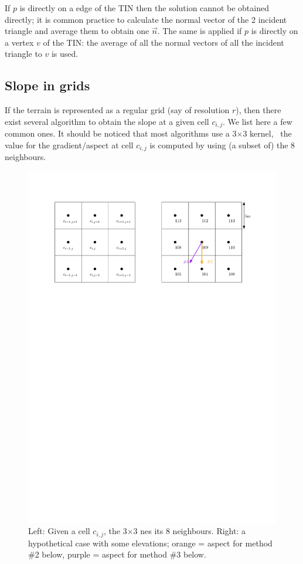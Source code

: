 If $p$ is directly on a edge of the TIN then the solution cannot be obtained directly; it is common practice to calculate the normal vector of the 2 incident triangle and average them to obtain one $\vec{n}$.
The same is applied if $p$ is directly on a vertex $v$ of the TIN: the average of all the normal vectors of all the incident triangle to $v$ is used.


\subsection{Slope in grids}

If the terrain is represented as a regular grid (say of resolution $r$), then there exist several algorithm to obtain the slope at a given cell $c_{i,j}$.
We list here a few common ones.
It should be noticed that most algorithms use a 3$\times$3 kernel, \ie\ the value for the gradient/aspect at cell $c_{i,j}$ is computed by using (a subset of) the 8 neighbours.
\begin{figure}
  \centering
  \includegraphics[width=0.7\linewidth]{figs/slope_grid}
  \caption{Left: Given a cell $c_{i,j}$, the 3$\times$3 nes its 8 neighbours. Right: a hypothetical case with some elevations; orange = aspect for method \#2 below, purple = aspect for method \#3 below.}
\label{fig:slope_grid}
\end{figure}


